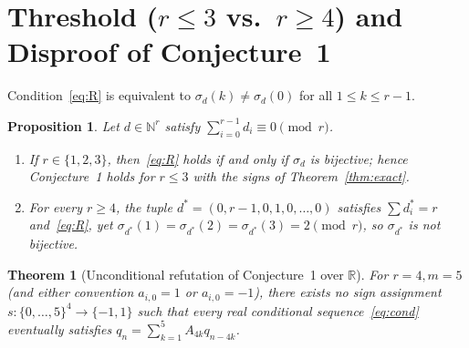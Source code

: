 \documentclass[11pt]{article}
\newtheorem{theorem}{Theorem}
\newtheorem{proposition}{Proposition}
\theoremstyle{remark}
\begin{document}
\section{Threshold (\texorpdfstring{$r \le 3$ vs.\ $r \ge 4$}{r <= 3 vs. r >= 4}) and Disproof of Conjecture~1}

Condition~\eqref{eq:R} is equivalent to $\sigma_d(k) \ne \sigma_d(0)$ for all $1 \le k \le r - 1$.

\begin{proposition}\label{prop:thresh}
Let $d \in \mathbb{N}^r$ satisfy $\sum_{i=0}^{r-1} d_i \equiv 0 \pmod{r}$.
\begin{enumerate}
\item If $r \in \{1, 2, 3\}$, then~\eqref{eq:R} holds if and only if $\sigma_d$ is bijective; hence Conjecture~1 holds for $r \le 3$ with the signs of Theorem~\ref{thm:exact}.
\item For every $r \ge 4$, the tuple $d^* = (0, r-1, 0, 1, 0, \dots, 0)$ satisfies $\sum d^*_i = r$ and~\eqref{eq:R}, yet $\sigma_{d^*}(1) = \sigma_{d^*}(2) = \sigma_{d^*}(3) = 2 \pmod{r}$, so $\sigma_{d^*}$ is not bijective.
\end{enumerate}
\end{proposition}

\begin{theorem}[Unconditional refutation of Conjecture~1 over $\mathbb{R}$]\label{thm:c1}
For $r = 4, m = 5$ (and either convention $a_{i,0} = 1$ or $a_{i,0} = -1$), there exists no sign assignment $s : \{0, \dots, 5\}^4 \to \{-1, 1\}$ such that every real conditional sequence~\eqref{eq:cond} eventually satisfies $q_n = \sum_{k=1}^{5} A_{4k} q_{n-4k}$.
\end{theorem}
\end{document}
